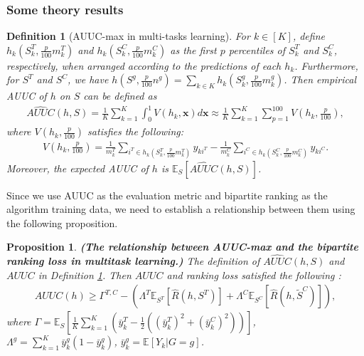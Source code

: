 \documentclass{article}
\def\vx{{\mathbf{x}}}
\def\eE{\mathbb{E}}
\newtheorem{proposition}{Proposition}
\newtheorem{definition}{Definition}
\begin{document}
\subsubsection{Some theory results}
\begin{definition}[AUUC-max in multi-tasks learning] \label{def:multi own2 auuc} For \( k \in [K] \), define \( h_k(S_k^T, \frac{p}{100}m_k^T) \) and \( h_k(S_k^C, \frac{p}{100}m_k^C) \) as the first \( p \) percentiles of \( S_k^T \) and \( S_k^C \), respectively, when arranged according to the predictions of each \( h_k \). Furthermore, for \( S^T \) and \( S^C \), we have \( h(S^g, \frac{p}{100} n^g) = \sum_{k \in K} h_k(S_k^g, \frac{p}{100} m_k^g) \). 
Then empirical AUUC of $h$ on $S$ can be defined as 
\begin{align*}
    \widehat{AUUC} (h,S) =  \frac{1}{K} \sum_{k=1}^K \int_{0}^{1} V(h_k,\vx) d \vx 
    \approx  \frac{1}{K} \sum_{k=1}^K \sum_{p = 1}^{100} V(h_k,\frac{p}{100}),
\end{align*}
where $V(h_k,\frac{p}{100})$ satisfies the following: 
\begin{align*}
     V(h_k,\frac{p}{100}) = \frac{1}{m_k^T} \sum_{i^T \in h_k(S_k^T, \frac{p}{100}m_k^T) } y_{k i^T} - \frac{1}{m_k^C} \sum_{i^C \in h_k(S_k^C, \frac{p}{100}m_k^C) } y_{k i^C}.
\end{align*}
Moreover, the expected AUUC of $h$ is $\eE_S [\widehat{AUUC}(h,S)]$.
\end{definition}

Since we use AUUC as the evaluation metric and bipartite ranking as the algorithm training data, we need to establish a relationship between them using the following proposition. 
\begin{proposition} \textnormal{\textbf{(The relationship between AUUC-max and the bipartite ranking loss in multitask learning.)}}  \label{pro:multi own2 ranking auuc} The definition of $\widehat{AUUC}(h,S) $ and $AUUC$ in Definition \ref{def:multi own2 auuc}. Then $AUUC$ and ranking loss satisfied the following : 
\begin{align*}
     AUUC (h)  \geq \Gamma^{T,C} -  \left( \Lambda^T \eE_{S^T} [ \hat{R}(h,S^T) ] + \Lambda^C \eE_{S^C} [ \hat{R}(h,\widetilde{S}^C) ] \right),
\end{align*}
where $\Gamma = \eE_{S} [\frac{1}{K} \sum_{k=1}^K (\bar{y}_k^T - \frac{1}{2} ((\bar{y}_k^T)^2 + (\bar{y}_k^C)^2) )]$, $\Lambda^g = \sum_{k=1}^K \bar{y}_k^g (1-\bar{y}_k^g) $, $\bar{y}_k^g = \eE [Y_k | G=g]$.     
\end{proposition}
\end{document}
